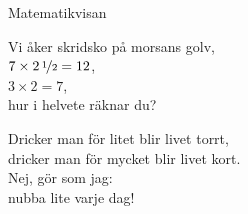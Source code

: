 \begin{song}{Matematikvisan}
	
	
	
	Vi åker skridsko på morsans golv,\\
	$7 \times 2\,\nicefrac{1}{2} = 12$,\\
	$3 \times 2 = 7$,\\
	hur i helvete räknar du?
	
	Dricker man för litet blir livet torrt,\\
	dricker man för mycket blir livet kort.\\
	Nej, gör som jag:\\
	nubba lite varje dag!
	
\end{song}

